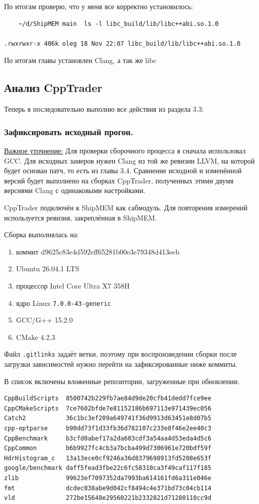 \documentclass[a4paper,12pt]{article}
\begin{document}
По итогам проверю, что у меня все корректно установилось:
\begin{lstlisting}
    ~/d/ShipMEM main  ls -l libc_build/lib/libc++abi.so.1.0

.rwxrwxr-x 406k oleg 18 Nov 22:07 libc_build/lib/libc++abi.so.1.0
\end{lstlisting}

По итогам главы установлен Clang, а так же libc

\subsection{Анализ CppTrader}

Теперь я последовательно выполню все действия из раздела 3.3:
\subsubsection{Зафиксировать исходный прогон.}

\underline{Важное уточнение:} Для проверки сборочного процесса я сначала использовал
GCC.
Для исходных
замеров нужен Clang из той же ревизии LLVM, на которой будет основан патч, то есть 
из главы 3.4.
Сравнение исходной и изменённой версий будет выполнено на сборках CppTrader,
полученных этими двумя версиями Clang с одинаковыми настройками.


CppTrader подключён к ShipMEM как сабмодуль. Для повторения измерений
используется ревизия, закреплённая в ShipMEM.

Сборка выполнялась на:
\begin{enumerate}
    \item коммит d9625c83e4d592eff65281b00e3e79348d413eeb
    \item Ubuntu 26.04.1 LTS
    \item процессор Intel Core Ultra X7 358H
    \item ядро Linux \texttt{7.0.0-43-generic}
    \item GCC/G++ 15.2.0
    \item CMake 4.2.3
\end{enumerate}

Файл \texttt{.gitlinks} задаёт ветки, поэтому при воспроизведении сборки
после загрузки зависимостей нужно перейти на зафиксированные ниже коммиты.

В список включены вложенные репозитории, загруженные при обновлении.
\begin{verbatim}
CppBuildScripts  8500742b229fb7ae84d9de20cfb41dedd7fce9ee
CppCMakeScripts  7ce7602bfde7e81152186b697113e971439ec056
Catch2           36c1bc3ef209a649741f36d9913d63451e8d07b5
cpp-optparse     b90dd73f1d33fb36d782107c233e8f46e2ee40c3
CppBenchmark     b3cfd0abef17a2da603cdf3a54aa4d53eda4d5c6
CppCommon        b6b9927fc4cb3a7bcba499d7306961e720bdf59f
HdrHistogram_c   13a13ece0cf9246a36d8379698913fd5208e653f
google/benchmark daff5fead3fbe22c6fc58310ca3f49caf117f185
zlib             99623ef7097352da7993ba614161fd6a311e046e
fmt              dcdec038abe9d042cf8494c4e371bd73c04cb114
vld              272be15648e29560221b2332821d71280110cc9d
\end{verbatim}
\end{document}

